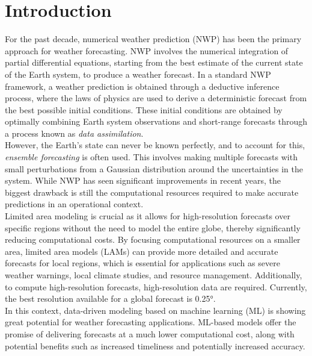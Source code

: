 \chapter{Introduction}

For the past decade, numerical weather prediction (NWP) has been the primary approach for weather forecasting. NWP involves the numerical integration of partial differential equations, starting from the best estimate of the current state of the Earth system, to produce a weather forecast. In a standard NWP framework, a weather prediction is obtained through a deductive inference process, where the laws of physics are used to derive a deterministic forecast from the best possible initial conditions. These initial conditions are obtained by optimally combining Earth system observations and short-range forecasts through a process known as \textit{data assimilation}.\\

However, the Earth's state can never be known perfectly, and to account for this, \textit{ensemble forecasting} is often used. This involves making multiple forecasts with small perturbations from a Gaussian distribution around the uncertainties in the system. While NWP has seen significant improvements in recent years, the biggest drawback is still the computational resources required to make accurate predictions in an operational context.\\

Limited area modeling is crucial as it allows for high-resolution forecasts over specific regions without the need to model the entire globe, thereby significantly reducing computational costs. By focusing computational resources on a smaller area, limited area models (LAMs) can provide more detailed and accurate forecasts for local regions, which is essential for applications such as severe weather warnings, local climate studies, and resource management. Additionally, to compute high-resolution forecasts, high-resolution data are required. Currently, the best resolution available for a global forecast is 0.25°.\\

In this context, data-driven modeling based on machine learning (ML) is showing great potential for weather forecasting applications. ML-based models offer the promise of delivering forecasts at a much lower computational cost, along with potential benefits such as increased timeliness and potentially increased accuracy.\\

